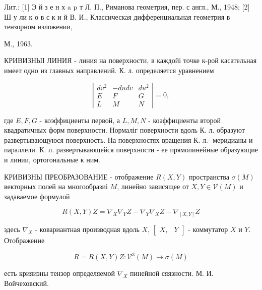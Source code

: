 \documentclass[10pt]{article}
\begin{document}
Лит.: [1] Э й з е н х a p т Л. П., Риманова геометрия, пер. с англ., М., 1948; [2] Ш у ли к о в с к и й В. И., Классическая дифференциальная геометрия в тензорном изложении,

М., 1963.



КРИВИЗНЫІ ЛИНИЯ - линия на поверхности, в каждойі точке к-рой касательная имеет одно из главных направлений. К. л. определяется уравнением



\[

\left|\begin{array}{lcc}

d v^{2} & -d u d v & d u^{2} \\

E & F & G \\

L & M & N

\end{array}\right|=0,

\]



где $E, F, G$ - коэффициенты первой, а $L, M, N$ - коәффициенты второй квадратичных форм поверхности. Нормаліг поверхности вдоль К. л. образуют развертывающуюся поверхность. На поверхностях вращения К. л.- меридианы и параллели. К. л. развертывающейся поверхности - ее прямолинейные образующие и линии, ортогональные к ним.



КРИВИЗНЫ ПРЕОБРАЗОВАНИЕ - отображение $R(X, Y)$ пространства $\mathscr{\sigma}(M)$ векторных полей на многообразиі $M$, линейно зависящее от $X, Y \in \mathscr{V}(M)$ и задаваемое формулой



\[

R(X, Y) Z=\nabla_{X} \nabla_{Y} Z-\nabla_{Y} \nabla_{X} Z-\nabla_{[X, Y]} Z

\]



здесь $\nabla_{X}$ - ковариантная производная вдоль $X$, $\left[\begin{array}{ll}X, & Y\end{array}\right]$ - коммутатор $X$ и $Y$. Отображение



\[

R=R(X, Y) Z: \mathscr{V}^{3}(M) \rightarrow \mathscr{\sigma}(M)

\]



есть крияизны тензор определяемой $\nabla_{X}$ пинейной сяязности. М. И. Войчеховский.
\end{document}
